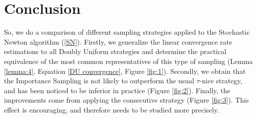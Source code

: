 \documentclass{article}
\theoremstyle{definition}
\theoremstyle{assumption}
\theoremstyle{lemma}
\theoremstyle{theorem}
\theoremstyle{proposition}
\begin{document}
	\section{Conclusion}
	So, we do a comparison of different sampling strategies applied to the Stochastic Newton algorithm (\ref{SN}). Firstly, we generalize the linear convergence rate estimations to all Doubly Uniform strategies and determine the practical equivalence of the most common representatives of this type of sampling (Lemma \ref{lemma:4}, Equation \ref{DU convergence}, Figure \ref{fig:1}). Secondly, we obtain that the Importance Sampling is not likely to outperform the usual $\tau$-nice strategy, and has been noticed to be inferior in practice (Figure \ref{fig:2}). Finally, the improvements come from applying the consecutive strategy (Figure \ref{fig:3}). This effect is encouraging, and therefore needs to be studied more precisely.
	
	
\renewcommand\refname{References}	


\end{document}
